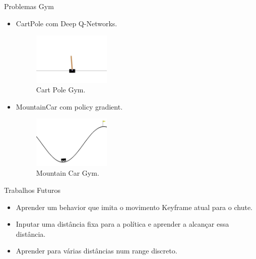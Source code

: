 \documentclass{beamer}
\begin{document}
\begin{frame}{Problemas Gym}
\begin{itemize}
\item
	CartPole com Deep Q-Networks.
\begin{figure}[h!]
   \centering
       \includegraphics[width=0.35\textwidth]{figures/cartpole.jpg}
 \caption{Cart Pole Gym.}
\end{figure}

\item MountainCar com policy gradient.
\begin{figure}[h!]
   \centering
       \includegraphics[width=0.35\textwidth]{figures/mountaincar.jpg}
 \caption{Mountain Car Gym.}
\end{figure}

\end{itemize}
\end{frame}


\begin{frame}{Trabalhos Futuros}
  \begin{itemize}
  \setlength\itemsep{1em}
    \item
    Aprender um behavior que imita o movimento Keyframe atual para o chute.
    \item
    Inputar uma distância fixa para a política e aprender a alcançar essa distância.
    \item
    Aprender para várias distâncias num range discreto.
  \end{itemize}
\end{frame}
\end{document}
